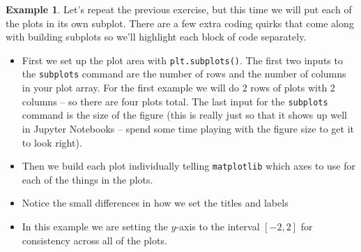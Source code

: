 \documentclass[
]{book}
\providecommand{\tightlist}{%
  \setlength{\itemsep}{0pt}\setlength{\parskip}{0pt}}
\theoremstyle{definition}
\theoremstyle{definition}
\newtheorem{example}{Example}[chapter]
\theoremstyle{definition}
\theoremstyle{remark}
\begin{document}
\begin{example}
\protect\hypertarget{exm:unnamed-chunk-762}{}{\label{exm:unnamed-chunk-762} }Let's repeat the previous exercise, but this time we will put each of the plots in its own subplot. There are a few extra coding quirks that come along with building subplots so we'll highlight each block of code separately.

\begin{itemize}
\tightlist
\item
  First we set up the plot area with \texttt{plt.subplots()}. The first two inputs to the \texttt{subplots} command are the number of rows and the number of columns in your plot array. For the first example we will do 2 rows of plots with 2 columns -- so there are four plots total. The last input for the \texttt{subplots} command is the size of the figure (this is really just so that it shows up well in Jupyter Notebooks -- spend some time playing with the figure size to get it to look right).
\item
  Then we build each plot individually telling \texttt{matplotlib} which axes to use for each of the things in the plots.
\item
  Notice the small differences in how we set the titles and labels
\item
  In this example we are setting the \(y\)-axis to the interval \([-2,2]\) for consistency across all of the plots.
\end{itemize}
\end{example}
\end{document}
